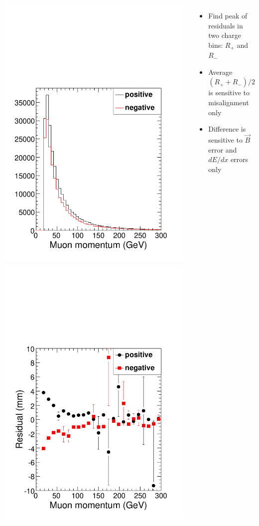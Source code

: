 \documentclass[compress]{beamer}
\begin{document}
\begin{frame}
\begin{columns}
\includegraphics[width=0.5\linewidth]{demo_momentum.pdf}
\includegraphics[width=0.5\linewidth]{demo_residual.pdf}

\begin{itemize}
\item Find peak of residuals in two charge bins: $R_+$ and $R_-$
\item Average $(R_+ + R_-)/2$ is sensitive to misalignment only
\item Difference is sensitive to $\vec{B}$ error and $dE/dx$ errors
  only
\end{itemize}
\vspace{0.3 cm}
\end{columns}
\end{frame}
\end{document}
